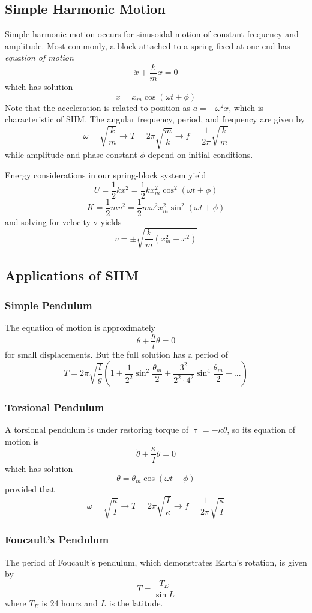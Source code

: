 \documentclass[../PhysicsFormulae.tex]{subfiles}
\begin{document}
\subsection{Simple Harmonic Motion}
Simple harmonic motion occurs for sinusoidal motion of constant frequency and amplitude. Most commonly, a block attached to a spring fixed at one end has \textit{equation of motion}
\[ \ddot{x} + \frac{k}{m}x = 0 \]
which has solution 
\[ x = x_m \cos(\omega t + \phi) \]
Note that the acceleration is related to position as $a = -\omega^2 x$, which is characteristic of SHM. The angular frequency, period, and frequency are given by
\[ \omega = \sqrt{\frac{k}{m}} \rightarrow T = 2\pi \sqrt{\frac{m}{k}} \rightarrow f = \frac{1}{2\pi}\sqrt{\frac{k}{m}} \]
while amplitude and phase constant $\phi$ depend on initial conditions. \bigskip

Energy considerations in our spring-block system yield
\[ U = \frac{1}{2}kx^2 = \frac{1}{2}kx_m^2\cos^2(\omega t + \phi) \]
\[ K = \frac{1}{2}mv^2 = \frac{1}{2}m\omega^2x_m^2\sin^2(\omega t + \phi) \]
and solving for velocity v yields
\[ v = \pm \sqrt{\frac{k}{m}(x_m^2 - x^2)} \]

\subsection{Applications of SHM}
\subsubsection{Simple Pendulum}
The equation of motion is approximately 
\[ \ddot{\theta} + \frac{g}{l}\theta = 0 \]
for small displacements. But the full solution has a period of
\[ T = 2\pi \sqrt{\frac{l}{g}} \left( 1 + \frac{1}{2^2}\sin^2{\frac{\theta_m}{2}} + \frac{3^2}{2^2\cdot 4^2}\sin^4{\frac{\theta_m}{2}} + ...\right) \]

\subsubsection{Torsional Pendulum}
A torsional pendulum is under restoring torque of $\uptau = -\kappa \theta$, so its equation of motion is
\[ \ddot{\theta} + \frac{\kappa}{I}\theta = 0 \]
which has solution 
\[ \theta = \theta_m\cos(\omega t + \phi) \]
provided that
\[ \omega = \sqrt{\frac{\kappa}{I}} \rightarrow T = 2\pi \sqrt{\frac{I}{\kappa}} \rightarrow f=\frac{1}{2\pi}\sqrt{\frac{\kappa}{I}} \]

\subsubsection{Foucault's Pendulum}
The period of Foucault's pendulum, which demonstrates Earth's rotation, is given by
\[ T = \frac{T_E}{\sin{L}} \]
where $T_E$ is 24 hours and $L$ is the latitude. 
\end{document}
